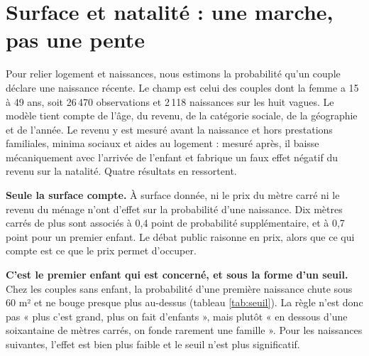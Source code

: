 \documentclass[11pt,a4paper]{article}
\begin{document}
\section{Surface et natalité : une marche, pas une pente}

Pour relier logement et naissances, nous estimons la probabilité qu'un couple déclare une naissance récente. Le champ est celui des couples dont la femme a 15 à 49 ans, soit 26\,470 observations et 2\,118 naissances sur les huit vagues. Le modèle tient compte de l'âge, du revenu, de la catégorie sociale, de la géographie et de l'année. Le revenu y est mesuré avant la naissance et hors prestations familiales, minima sociaux et aides au logement : mesuré après, il baisse mécaniquement avec l'arrivée de l'enfant et fabrique un faux effet négatif du revenu sur la natalité. Quatre résultats en ressortent.

\textbf{Seule la surface compte.} À surface donnée, ni le prix du mètre carré ni le revenu du ménage n'ont d'effet sur la probabilité d'une naissance. Dix mètres carrés de plus sont associés à 0,4 point de probabilité supplémentaire, et à 0,7 point pour un premier enfant. Le débat public raisonne en prix, alors que ce qui compte est ce que le prix permet d'occuper.

\textbf{C'est le premier enfant qui est concerné, et sous la forme d'un seuil.} Chez les couples sans enfant, la probabilité d'une première naissance chute sous 60 m² et ne bouge presque plus au-dessus (tableau \ref{tab:seuil}). La règle n'est donc pas « plus c'est grand, plus on fait d'enfants », mais plutôt « en dessous d'une soixantaine de mètres carrés, on fonde rarement une famille ». Pour les naissances suivantes, l'effet est bien plus faible et le seuil n'est plus significatif.
\end{document}
